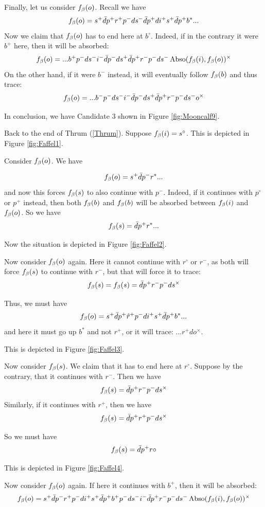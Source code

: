 Finally, let us consider $f_\beta(o)$. Recall we have
\[
f_\beta(o) = s^+ \bar{d} p^+ r^+ p^- d s^- \bar{d} p^+ d i^+ s^+ \bar{d} p^+ b^*...
\]
Now we claim that $f_\beta(o)$ has to end here at $b^\circ$. Indeed, if in the contrary it were $b^+$ here, then it will be absorbed:
\[
f_\beta(o) = ...b^+ p^- d s^- i^- \bar{d} p^- d s^+ \bar{d} p^+r^- p^- d s^- \operatorname{Abso}(f_\beta(i), f_\beta(o))^\times
\]
On the other hand, if it were $b^-$ instead, it will eventually follow $f_\beta(b)$ and thus trace:
\[
f_\beta(o) = ... b^- p^- d s^- i^- \bar{d} p^- d s^+ \bar{d} p^+ r^- p^- d s^- o^\times
\]

In conclusion, we have Candidate 3 shown in Figure \ref{fig:Mooncalf9}.

\label{Faffel}
Back to the end of Thrum (\ref{Thrum}). Suppose $f_\beta(i) = s^\circ$. This is depicted in Figure \ref{fig:Faffel1}.

Consider $f_\beta(o)$. We have

\[
f_\beta(o) = s^+ \bar{d} p^- r^*...
\]
and now this forces $f_\beta(s)$ to also continue with $p^-$. Indeed, if it continues with $p^\circ$ or $p^+$ instead, then both $f_\beta(b)$ and $f_\beta(b)$ will be absorbed between $f_\beta(i)$ and $f_\beta(o)$. So we have
\[
f_\beta(s) = \bar{d} p^+ r^*...
\]


Now the situation is depicted in Figure \ref{fig:Faffel2}.

Now consider $f_\beta(o)$ again. Here it cannot continue with $r^\circ$ or $r^-$, as both will force $f_\beta(s)$ to continue with $r^-$, but that will force it to trace:
\[
f_\beta(s) = f_\beta(s) = \bar{d} p^+ r^- p^- d s^\times
\]

Thus, we must have
\[
f_\beta(o) = s^+ \bar{d} p^+ \hat{r}^+ p^- d i^+ s^+ \bar{d} p^+ b^*...
\]
and here it must go up $b^*$ and not $r^+$, or it will trace: $...r^+d o^\times$.

This is depicted in Figure \ref{fig:Faffel3}.

Now consider $f_\beta(s)$. We claim that it has to end here at $r^\circ$. Suppose by the contrary, that it continues with $r^-$. Then we have
\[
f_\beta(s) = \bar{d} p^+ r^- p^- d s^\times
\]
Similarly, if it continues with $r^+$, then we have
\[
f_\beta(s) = \bar{d} p^+ r^+ p^- d s^\times
\]

So we must have
\[
f_\beta(s) = \bar{d} p^+ r\circ
\]

This is depicted in Figure \ref{fig:Faffel4}.

Now consider $f_\beta(o)$ again. If here it continues with $b^+$, then it will be absorbed:
\[
f_\beta(o) = s^+ \bar{d} p^- r^+ p^- d i^+ s^+ \bar{d} p^+ b^+ p^- d s^- i^- \bar{d} p^+ r^- p^- d s^- \operatorname{Abso}(f_\beta(i), f_\beta(o))^\times
\]

